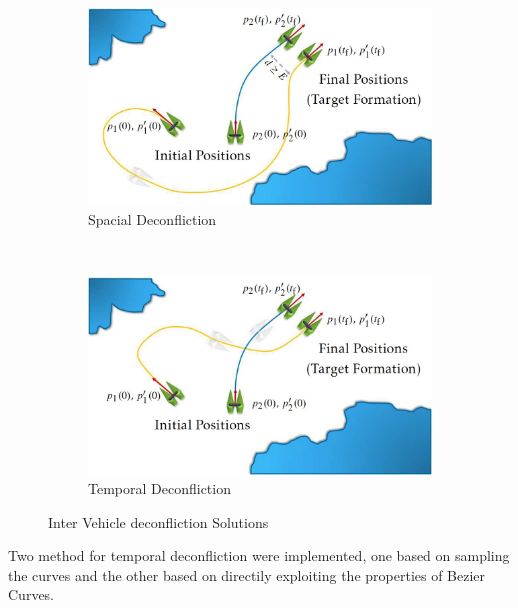 \begin{figure}
    \centering
    \begin{subfigure}[b]{0.45\textwidth}
        \includegraphics[width=\textwidth]{Images/spacial_deconf.jpg}
        \caption{Spacial Deconfliction}
    \end{subfigure}
    ~
    \begin{subfigure}[b]{0.45\textwidth}
        \includegraphics[width=\textwidth]{Images/temporal_deconf.jpg}
        \caption{Temporal Deconfliction}
    \end{subfigure}
    \caption{Inter Vehicle deconfliction Solutions}
    \label{fig:deconfliction}
\end{figure}

\par Two method for temporal deconfliction were implemented, one based on sampling the curves and the other based on directily exploiting the properties of Bezier Curves.


